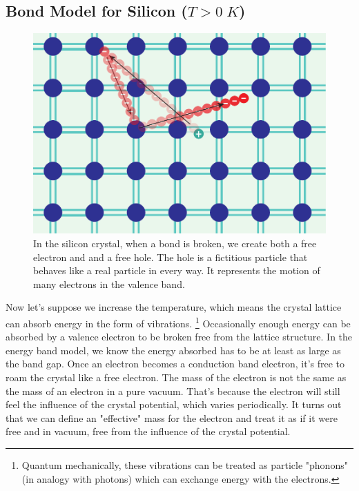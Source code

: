 \subsection{Bond Model for Silicon (\texorpdfstring{$T>0\;K$}{T > 0K})}
\begin{figure}[tb]
\centering
\includegraphics[width=.5\columnwidth]{silicon_broken_bond_motion}
\caption{In the silicon crystal, when a bond is broken, we create both a free electron and and a free hole.  The hole is a fictitious particle that behaves like a real particle in every way. It represents the motion of many electrons in the valence band.}
\label{fig:silicon_broken_bond}
\end{figure}

Now let's suppose we increase the temperature, which means the crystal lattice can absorb energy in the form of vibrations.  \footnote{Quantum mechanically, these vibrations can be treated as particle "phonons" (in analogy with photons) which can exchange energy with the electrons.}  Occasionally enough energy can be absorbed by a valence electron to be broken free from the lattice structure.  In the energy band model, we know the energy absorbed has to be at least as large as the band gap.  Once an electron becomes a conduction band electron, it's free to roam the crystal like a free electron.  The mass of the electron is not the same as the mass of an electron in a pure vacuum.  That's because the electron will still feel the influence of the crystal potential, which varies periodically.  It turns out that we can define an "effective" mass for the electron and treat it as if it were free and in vacuum, free from the influence of the crystal potential. 
